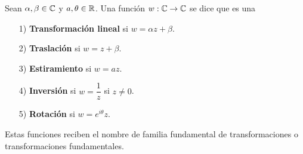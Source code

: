 \begin{defi}
	Sean $\alpha,\beta\in \mathbb{C}$ y $a,\theta\in\mathbb{R}$. Una función $w:\mathbb{C}\rightarrow\mathbb{C}$ se dice que es una 
	\begin{itemize}
		\item [1)] \textbf{Transformación lineal} si $w=\alpha z+\beta$.
		\item [2)] \textbf{Traslación} si $w=z+\beta$.
		\item [3)] \textbf{Estiramiento} si $w=az$.
		\item [4)] \textbf{Inversión} si $w=\dfrac{1}{z}$ si $z\neq0$.
		\item [5)] \textbf{Rotación} si $w=e^{i\theta}z$.
	\end{itemize}
\end{defi}
Estas funciones reciben el nombre de familia fundamental de transformaciones o transformaciones fundamentales.
